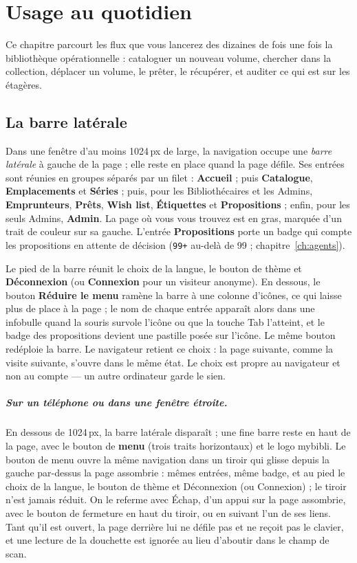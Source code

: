 \chapter{Usage au quotidien}
\label{ch:usage}

Ce chapitre parcourt les flux que vous lancerez des dizaines de
fois une fois la bibliothèque opérationnelle : cataloguer un nouveau
volume, chercher dans la collection, déplacer un volume, le prêter,
le récupérer, et auditer ce qui est sur les étagères.

\section{La barre latérale}\label{sec:navbar}

Dans une fenêtre d'au moins 1024\,px de large, la navigation occupe
une \emph{barre latérale} à gauche de la page ;
elle reste en place quand la page défile. Ses entrées sont réunies en
groupes séparés par un filet : \textbf{Accueil} ; puis
\textbf{Catalogue}, \textbf{Emplacements} et \textbf{Séries} ; puis,
pour les Bibliothécaires et les Admins, \textbf{Emprunteurs},
\textbf{Prêts}, \textbf{Wish list}, \textbf{Étiquettes} et
\textbf{Propositions} ; enfin, pour les seuls Admins, \textbf{Admin}.
La page où vous vous trouvez est en gras, marquée d'un trait de
couleur sur sa gauche. L'entrée \textbf{Propositions} porte un badge
qui compte les propositions en attente de décision (\texttt{99+}
au-delà de 99 ; chapitre~\ref{ch:agents}).

Le pied de la barre réunit le choix de la langue, le bouton de thème
et \textbf{Déconnexion} (ou \textbf{Connexion} pour un visiteur
anonyme). En dessous, le bouton \textbf{Réduire le menu} ramène la
barre à une colonne d'icônes, ce qui laisse plus de place à la page ;
le nom de chaque entrée apparaît alors dans une infobulle quand la
souris survole l'icône ou que la touche Tab l'atteint, et le badge des
propositions devient une pastille posée sur l'icône. Le même bouton
redéploie la barre. Le navigateur retient ce choix : la page suivante,
comme la visite suivante, s'ouvre dans le même état. Le choix est
propre au navigateur et non au compte --- un autre ordinateur garde le
sien.

\paragraph{Sur un téléphone ou dans une fenêtre étroite.} En dessous
de 1024\,px, la barre latérale disparaît ; une fine barre reste en
haut de la page, avec le bouton de \textbf{menu} (trois traits
horizontaux) et le logo mybibli. Le bouton de menu ouvre la même
navigation dans un tiroir qui glisse depuis la gauche par-dessus la
page assombrie : mêmes entrées, même badge, et au pied le choix de la
langue, le bouton de thème et Déconnexion (ou Connexion) ; le tiroir
n'est jamais réduit. On le referme avec Échap, d'un appui sur la page
assombrie, avec le bouton de fermeture en haut du tiroir, ou en
suivant l'un de ses liens. Tant qu'il est ouvert, la page derrière lui
ne défile pas et ne reçoit pas le clavier, et une lecture de la
douchette est ignorée au lieu d'aboutir dans le champ de scan.

